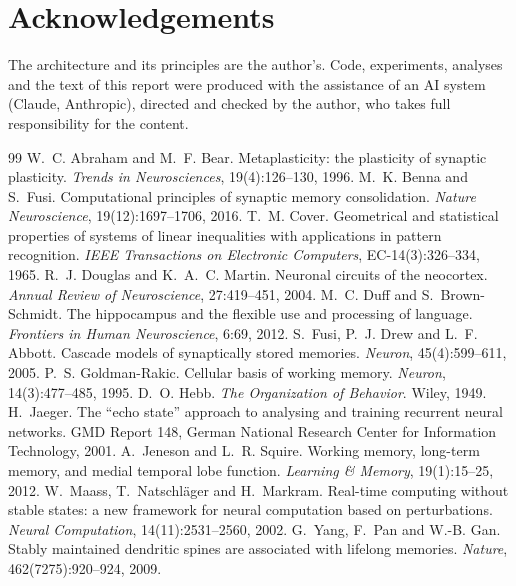 \documentclass[11pt]{article}
\begin{document}
\section*{Acknowledgements}
The architecture and its principles are the author's. Code, experiments, analyses and the text of this report were
produced with the assistance of an AI system (Claude, Anthropic), directed and checked by the author, who takes full
responsibility for the content.

\begin{thebibliography}{99}\small
{} W.~C. Abraham and M.~F. Bear. Metaplasticity: the plasticity of synaptic plasticity.
\emph{Trends in Neurosciences}, 19(4):126--130, 1996.
 M.~K. Benna and S.~Fusi. Computational principles of synaptic memory consolidation.
\emph{Nature Neuroscience}, 19(12):1697--1706, 2016.
 T.~M. Cover. Geometrical and statistical properties of systems of linear inequalities with
applications in pattern recognition. \emph{IEEE Transactions on Electronic Computers}, EC-14(3):326--334, 1965.
 R.~J. Douglas and K.~A.~C. Martin. Neuronal circuits of the neocortex. \emph{Annual Review
of Neuroscience}, 27:419--451, 2004.
 M.~C. Duff and S.~Brown-Schmidt. The hippocampus and the flexible use and processing of language.
\emph{Frontiers in Human Neuroscience}, 6:69, 2012.
 S.~Fusi, P.~J. Drew and L.~F. Abbott. Cascade models of synaptically stored memories. \emph{Neuron},
45(4):599--611, 2005.
 P.~S. Goldman-Rakic. Cellular basis of working memory. \emph{Neuron}, 14(3):477--485, 1995.
 D.~O. Hebb. \emph{The Organization of Behavior}. Wiley, 1949.
 H.~Jaeger. The ``echo state'' approach to analysing and training recurrent neural networks.
GMD Report 148, German National Research Center for Information Technology, 2001.
 A.~Jeneson and L.~R. Squire. Working memory, long-term memory, and medial temporal lobe function.
\emph{Learning \& Memory}, 19(1):15--25, 2012.
 W.~Maass, T.~Natschl\"ager and H.~Markram. Real-time computing without stable states: a new
framework for neural computation based on perturbations. \emph{Neural Computation}, 14(11):2531--2560, 2002.
 G.~Yang, F.~Pan and W.-B. Gan. Stably maintained dendritic spines are associated with lifelong
memories. \emph{Nature}, 462(7275):920--924, 2009.
\end{thebibliography}
\end{document}
